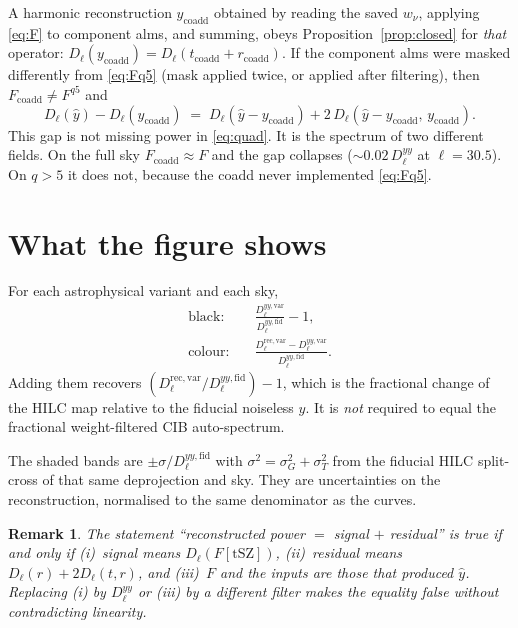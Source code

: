 \documentclass[11pt,a4paper]{article}
\newtheorem{remark}{Remark}
\begin{document}
A harmonic reconstruction \(y_{\mathrm{coadd}}\) obtained by reading the
saved \(w_\nu\), applying \eqref{eq:F} to component alms, and summing, obeys
Proposition~\ref{prop:closed} for \emph{that} operator:
\(D_\ell(y_{\mathrm{coadd}})=D_\ell(t_{\mathrm{coadd}}+r_{\mathrm{coadd}})\).
If the component alms were masked differently from \eqref{eq:Fq5} (mask
applied twice, or applied after filtering), then
\(F_{\mathrm{coadd}}\neq F^{q5}\) and
\begin{equation}
  D_\ell(\hat y)-D_\ell(y_{\mathrm{coadd}})
  \;=\;
  D_\ell(\hat y-y_{\mathrm{coadd}})
  + 2\, D_\ell(\hat y-y_{\mathrm{coadd}},\, y_{\mathrm{coadd}}).
  \label{eq:gap}
\end{equation}
This gap is not missing power in \eqref{eq:quad}. It is the spectrum of two
different fields. On the full sky \(F_{\mathrm{coadd}}\approx F\) and the gap
collapses (\(\sim 0.02\,D_\ell^{yy}\) at \(\ell=30.5\)). On \(q>5\) it does
not, because the coadd never implemented \eqref{eq:Fq5}.

\section{What the figure shows}

For each astrophysical variant and each sky,
\begin{align}
  \text{black:}
  &\quad
  \frac{D_\ell^{yy,\mathrm{var}}}{D_\ell^{yy,\mathrm{fid}}}-1,
  \label{eq:black}\\
  \text{colour:}
  &\quad
  \frac{D_\ell^{\mathrm{rec},\mathrm{var}}-D_\ell^{yy,\mathrm{var}}}
       {D_\ell^{yy,\mathrm{fid}}}.
  \label{eq:colour}
\end{align}
Adding them recovers
\((D_\ell^{\mathrm{rec},\mathrm{var}}/D_\ell^{yy,\mathrm{fid}})-1\),
which is the fractional change of the HILC map relative to the fiducial
noiseless \(y\). It is \emph{not} required to equal the fractional
weight-filtered CIB auto-spectrum.

The shaded bands are
\(\pm\sigma/D_\ell^{yy,\mathrm{fid}}\) with
\(\sigma^2=\sigma_G^2+\sigma_T^2\) from the fiducial HILC split-cross of
that same deprojection and sky. They are uncertainties on the reconstruction,
normalised to the same denominator as the curves.

\begin{remark}
The statement ``reconstructed power \(=\) signal \(+\) residual'' is true
if and only if (i)~signal means \(D_\ell(F[\mathrm{tSZ}])\), (ii)~residual
means \(D_\ell(r)+2D_\ell(t,r)\), and (iii)~\(F\) and the inputs are those
that produced \(\hat y\). Replacing (i) by \(D_\ell^{yy}\) or (iii) by a
different filter makes the equality false without contradicting linearity.
\end{remark}
\end{document}
